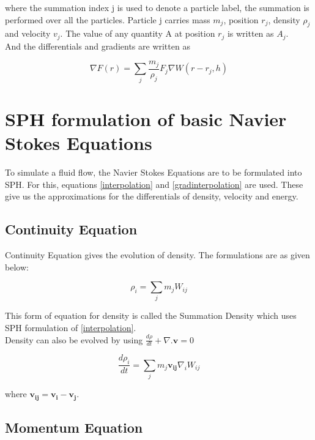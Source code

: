 \noindent
where the summation index j is used to denote a particle label, the summation is performed over all the particles. Particle j carries mass $m_j$, position $r_j$, density $\rho_j$ and velocity $v_j$. The value of any quantity A at position $r_j$ is written as $A_j$. \\

\noindent
And the differentials and gradients are written as 

\begin{equation}
 \nabla F(r) = \sum_j \frac{m_j}{\rho_j}F_j \nabla W(r-r_j, h)
  \label{gradinterpolation}
 \end{equation}


\section{SPH formulation of basic Navier Stokes Equations}

To simulate a fluid flow, the Navier Stokes Equations are to be 
formulated into SPH. For this, equations \ref{interpolation} and \ref{gradinterpolation}
are used. These give us the approximations for the differentials of density, velocity and energy.

\subsection{Continuity Equation}

Continuity Equation gives the evolution of density. The formulations
are as given below:

\begin{equation}
 \rho_i = \sum_j m_j W_{ij}
 \label{summation}
\end{equation}

This form of equation for density is called the Summation Density
which uses SPH formulation of \ref{interpolation}. \\

\noindent
Density can also be evolved by using $\frac{d\rho}{dt} + \nabla . \mathbf{v} = 0$

\begin{equation}
 \frac{d\rho_i}{dt} = \sum_j m_j \mathbf{v_{ij}} \nabla_i W_{ij}
  \label{Continuity}
 \end{equation}

where $\mathbf{v_{ij}} = \mathbf{v_i} - \mathbf{v_j}$.\\


\subsection{Momentum Equation}


